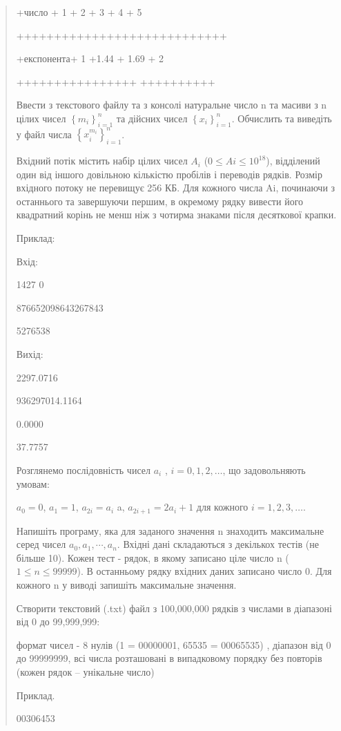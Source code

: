 \documentclass[]{article}
\begin{document}
\begin{quote}
+число + 1 + 2 + 3 + 4 + 5

++++++++++++++++++++++++++++

+експонента+ 1 +1.44 + 1.69 + 2

++++++++++++++++ ++++++++++

Ввести з текстового файлу та з консолі натуральне число n та масиви з n
цілих чисел \(\left\{ m_{i} \right\}_{i = 1}^{n}\) та дійсних чисел
\(\left\{ x_{i} \right\}_{i = 1}^{n}\). Обчислить та виведіть у файл
числа \(\left\{ x_{i}^{m_{i}} \right\}_{i = 1}^{n}\).

Вхідний потік містить набір цілих
чисел $A_i$ ($0 \le Ai \le 10^{18}$), відділений один від іншого
довільною кількістю пробілів і переводів рядків. Розмір вхідного потоку
не перевищує 256 КБ. Для кожного числа Ai, починаючи з останнього та
завершуючи першим, в окремому рядку вивести його квадратний корінь не
менш ніж з чотирма знаками після десяткової крапки.

Приклад:

Вхід:

1427 0

876652098643267843

5276538

Вихід:

2297.0716

936297014.1164

0.0000

37.7757

Розглянемо послідовність чисел
\(a_{i}\) , $i = 0, 1, 2, \ldots$, що задовольняють умовам:

\(a_{0} = 0\), \(a_{1} = 1\), \(a_{2i} = a_{i}\) a,
\(a_{2i + 1} = {2a}_{i} + 1\) для кожного $i = 1, 2, 3, \ldots $.

Напишіть програму, яка для заданого значення n знаходить максимальне
серед чисел \(a_{0},a_{1},\cdots,a_{n}\). Вхідні дані складаються з
декількох тестів (не більше 10). Кожен тест - рядок, в якому записано
ціле число n ($1 \le n \le 99 999$). В останньому рядку вхідних даних записано
число 0. Для кожного n у виводі запишіть максимальне значення.

Створити текстовий (.txt) файл з 100,000,000 рядків з числами в
діапазоні від 0 до 99,999,999:

формат чисел - 8 нулів (1 = 00000001, 65535 = 00065535) , діапазон від 0
до 99999999, всі числа розташовані в випадковому порядку без повторів
(кожен рядок -- унікальне число)

Приклад.

00306453


\end{quote}
\end{document}
